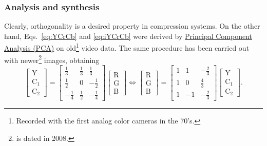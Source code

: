 \subsubsection{Analysis and synthesis}
Clearly, orthogonality is a desired property in compression
systems. On the other hand, Eqs.~\ref{eq:YCrCb} and \ref{eq:iYCrCb}
were derived by
\href{https://en.wikipedia.org/wiki/Principal_component_analysis}{Principal
  Component Analysis (PCA)} on old\footnote{Recorded with the first
analog color cameras in the 70's.} video data. The same procedure has
been carried out with newer\footnote{\cite{malvar2008lifting} is dated
in 2008.} images, obtaining
\begin{equation}
  \begin{bmatrix}
    \text{Y} \\
    \text{C}_1 \\
    \text{C}_2
  \end{bmatrix}
  =
  \begin{bmatrix}
    \frac{1}{3} & \frac{1}{3} &  \frac{1}{3} \\ 
    \frac{1}{2} &           0 & -\frac{1}{2} \\
   -\frac{1}{4} & \frac{1}{2} & -\frac{1}{4}
  \end{bmatrix}
  \begin{bmatrix}
    \text{R} \\
    \text{G} \\
    \text{B}
  \end{bmatrix}
  \Leftrightarrow
  \begin{bmatrix}
    \text{R} \\
    \text{G} \\
    \text{B}
  \end{bmatrix}
  =
  \begin{bmatrix}
    1  &  1  & -\frac{2}{3} \\ 
    1  &  0  &  \frac{4}{3} \\ 
    1  & -1  & -\frac{2}{3}
  \end{bmatrix}
  \begin{bmatrix}
    \text{Y} \\
    \text{C}_1 \\
    \text{C}_2
  \end{bmatrix}.
  \label{eq:optimal}
\end{equation}

